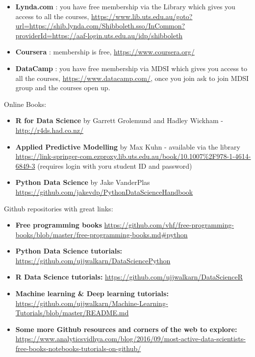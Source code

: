 \documentclass[]{book}
\providecommand{\tightlist}{%
  \setlength{\itemsep}{0pt}\setlength{\parskip}{0pt}}
\theoremstyle{definition}
\theoremstyle{definition}
\theoremstyle{remark}
\begin{document}
\begin{itemize}
\tightlist
\item
  \textbf{Lynda.com} : you have free membership via the Library which
  gives you access to all the courses,
  \url{https://www.lib.uts.edu.au/goto?url=https://shib.lynda.com/Shibboleth.sso/InCommon?providerId=https://aaf-login.uts.edu.au/idp/shibboleth}
\item
  \textbf{Coursera} : membership is free,
  \url{https://www.coursera.org/}
\item
  \textbf{DataCamp} : you have free membership via MDSI which gives you
  access to all the courses, \url{https://www.datacamp.com/}, once you
  join ask to join MDSI group and the courses open up.
\end{itemize}

Online Books:

\begin{itemize}
\tightlist
\item
  \textbf{R for Data Science} by Garrett Grolemund and Hadley Wickham -
  \url{http://r4ds.had.co.nz/}
\item
  \textbf{Applied Predictive Modelling} by Max Kuhn - available via the
  library
  \url{https://link-springer-com.ezproxy.lib.uts.edu.au/book/10.1007\%2F978-1-4614-6849-3}
  (requires login with yoru student ID and password)
\item
  \textbf{Python Data Science} by Jake VanderPlas
  \url{https://github.com/jakevdp/PythonDataScienceHandbook}
\end{itemize}

Github repositories with great links:

\begin{itemize}
\tightlist
\item
  \textbf{Free programming books}
  \url{https://github.com/vhf/free-programming-books/blob/master/free-programming-books.md\#python}
\item
  \textbf{Python Data Science tutorials:}
  \url{https://github.com/ujjwalkarn/DataSciencePython}
\item
  \textbf{R Data Science tutorials:}
  \url{https://github.com/ujjwalkarn/DataScienceR}
\item
  \textbf{Machine learning \& Deep learning tutorials:}
  \url{https://github.com/ujjwalkarn/Machine-Learning-Tutorials/blob/master/README.md}
\item
  \textbf{Some more Github resources and corners of the web to explore:}
  \url{https://www.analyticsvidhya.com/blog/2016/09/most-active-data-scientists-free-books-notebooks-tutorials-on-github/}
\end{itemize}
\end{document}
